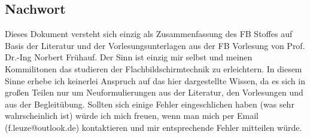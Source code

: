 \subsection{Nachwort}
Dieses Dokument versteht sich einzig als Zusammenfassung des FB Stoffes auf Basis der Literatur und der Vorlesungsunterlagen aus der FB Vorlesung von Prof. Dr.-Ing Norbert Frühauf. Der Sinn ist einzig mir selbst und meinen Kommilitonen das studieren der Flachbildschirmtechnik zu erleichtern. In diesem Sinne erhebe ich keinerlei Anspruch auf das hier dargestellte Wissen, da es sich in großen Teilen nur um Neuformulierungen aus der Literatur, den Vorlesungen und aus der Begleitübung. Sollten sich einige Fehler eingeschlichen haben (was sehr wahrscheinlich ist) würde ich mich freuen, wenn man mich per Email (f.leuze@outlook.de) kontaktieren und mir entsprechende Fehler mitteilen würde.